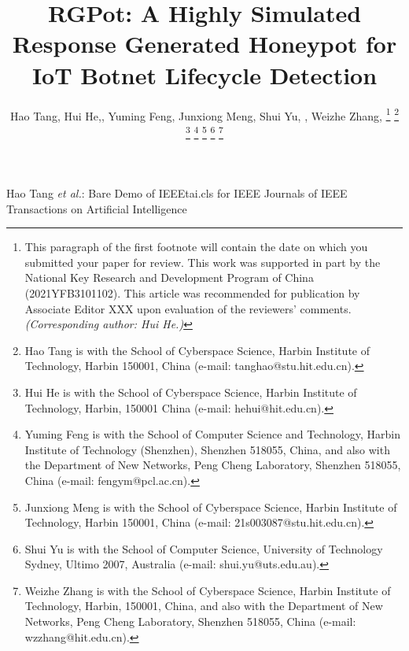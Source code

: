 \documentclass[journal]{IEEEtai}
\begin{document}
\title{RGPot: A Highly Simulated Response Generated Honeypot for IoT Botnet Lifecycle Detection} 


\author{Hao Tang, Hui He,, Yuming Feng, Junxiong Meng, Shui Yu, , Weizhe Zhang, 
\thanks{This paragraph of the first footnote will contain the date on which you submitted your paper for review. This work was supported in part by the National Key Research and Development Program of China (2021YFB3101102). This article was recommended for publication by Associate Editor XXX upon evaluation of the reviewers’ comments. \textit{(Corresponding author: Hui He.)}}
\thanks{Hao Tang is with the School of Cyberspace Science, Harbin Institute of Technology, Harbin 150001, China (e-mail: tanghao@stu.hit.edu.cn).}
\thanks{Hui He is with the School of Cyberspace Science, Harbin Institute of Technology, Harbin, 150001 China (e-mail: hehui@hit.edu.cn).}
\thanks{Yuming Feng is with the School of Computer Science and Technology, Harbin Institute of Technology (Shenzhen), Shenzhen 518055, China, and also with the Department of New Networks, Peng Cheng Laboratory, Shenzhen 518055, China (e-mail: fengym@pcl.ac.cn).}
\thanks{Junxiong Meng is with the School of Cyberspace Science, Harbin Institute of Technology, Harbin 150001, China (e-mail: 21s003087@stu.hit.edu.cn).}
\thanks{Shui Yu is with the School of Computer Science, University of Technology Sydney, Ultimo 2007, Australia (e-mail: shui.yu@uts.edu.au).}
\thanks{Weizhe Zhang is with the School of Cyberspace Science, Harbin Institute of Technology, Harbin, 150001, China, and also with the Department of New Networks, Peng Cheng Laboratory, Shenzhen 518055, China (e-mail: wzzhang@hit.edu.cn).}
}

{Hao Tang \MakeLowercase{\textit{et al.}}: Bare Demo of IEEEtai.cls for IEEE Journals of IEEE Transactions on Artificial Intelligence}

\maketitle
\end{document}
